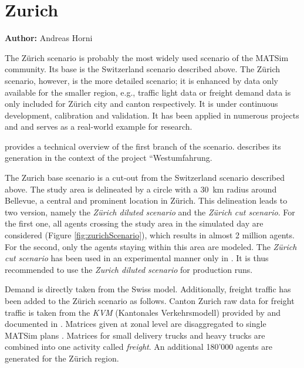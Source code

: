 \section{Zurich}
\label{sec:zhscenario}
\hfill \textbf{Author:} Andreas Horni

The Zürich scenario is probably the most widely used scenario of the MATSim community. Its base is the Switzerland scenario described above. The Zürich scenario, however, is the more detailed scenario; it is enhanced by data only available for the smaller region, e.g., traffic light data or freight demand data is only included for Zürich city and canton respectively. It is under continuous development, calibration and validation. It has been applied in numerous projects and and serves as a real-world example for research.   

\citet{HorniEtAl_TechRep_IVT_2011_a} provides a technical overview of the first branch of the scenario. \citet[][]{BalmerEtAl_ResRep_bdktzrh_2009} describes its generation in the context of the project ``Westumfahrung. 

The Zurich base scenario is a cut-out from the Switzerland scenario described above. The study area is delineated by a circle with a 30~km radius around Bellevue, a central and prominent location in Zürich. This delineation leads to two version, namely the \emph{Zürich diluted scenario} and the \emph{Zürich cut scenario}. For the first one, all agents crossing the study area in the simulated day are considered (Figure \ref{fig:zurichScenario}), which results in almost 2 million agents. For the second, only the agents staying within this area are modeled. The \emph{Zürich cut scenario} has been used in an experimental manner only in \citet[][]{Hackney_PhDThesis_2009}. It is thus recommended to use the \emph{Zurich diluted scenario} for production runs.

Demand is directly taken from the Swiss model. Additionally, freight traffic has been added to the Zürich scenario as follows. Canton Zurich raw data for freight traffic is taken from the \emph{KVM} (Kantonales Verkehrsmodell) provided by \citet{AMV_Webpage_2011} and documented in \citet[][]{GottardiBuergler_SV_1999}. Matrices given at zonal level are disaggregated to single MATSim plans \citep[][]{ShahM_TechRep_IVT_2010}. Matrices for small delivery trucks and heavy trucks are combined into one activity called \emph{freight}. An additional 180'000 agents are generated for the Zürich region.


